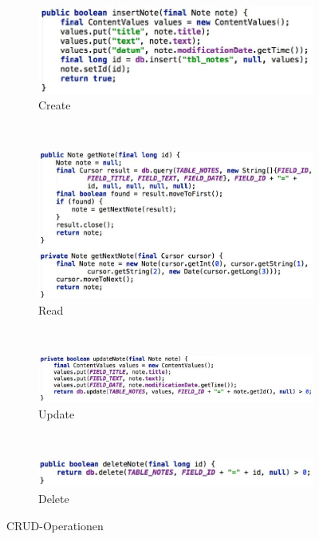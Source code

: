 \begin{figure}
	\centering
	\begin{subfigure}[b]{0.4\textwidth}
		\includegraphics[width=\textwidth]{fig/sqlite-create}
		\caption{Create}
	\end{subfigure}
	~
	\begin{subfigure}[b]{0.4\textwidth}
		\includegraphics[width=\textwidth]{fig/sqlite-read}
		\caption{Read}
	\end{subfigure}
	~
	\begin{subfigure}[b]{0.4\textwidth}
		\includegraphics[width=\textwidth]{fig/sqlite-update}
		\caption{Update}
	\end{subfigure}
	~
	\begin{subfigure}[b]{0.4\textwidth}
		\includegraphics[width=\textwidth]{fig/sqlite-delete}
		\caption{Delete}
	\end{subfigure}
	\caption{CRUD-Operationen}
	\label{fig:crud-operationen}
\end{figure}
